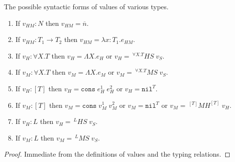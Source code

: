 \begin{lemma}
\label{cf}
\onehalfspacing
The possible syntactic forms of values of various types.
\begin{enumerate}
\item If $v_{HM}:N$ then $v_{HM}=\overline{n}$.
\item If $v_{HM}:T_{1}\rightarrow T_{2}$ then $v_{HM}=\lambda x:T_{1}.e_{HM}$.
\item If $v_{H}:\forall X.T$ then $v_{H}=\Lambda X.e_{H}$ or $v_{H}=\,^{\forall X.T}HS\;v_{S}$.
\item If $v_{M}:\forall X.T$ then $v_{M}=\Lambda X.e_{M}$ or $v_{M}=\,^{\forall X.T}MS\;v_{S}$.
\item If $v_{H}:[T]$ then $v_{H}=\mathtt{cons}\;e_{H}^{1}\;e_{H}^{2}$ or $v_{H}=\mathtt{nil}^{T}$.
\item If $v_{M}:[T]$ then $v_{M}=\mathtt{cons}\;v_{M}^{1}\;v_{M}^{2}$ or $v_{M}=\mathtt{nil}^{T}$ or $v_{M}=\,^{[T]}MH^{[T]}\;v_{H}$.
\item If $v_{H}:L$ then $v_{H}=\,^{L}HS\;v_{S}$.
\item If $v_{M}:L$ then $v_{M}=\,^{L}MS\;v_{S}$.
\end{enumerate}
\begin{proof}
Immediate from the definitions of values and the typing relations.
\end{proof}
\end{lemma}